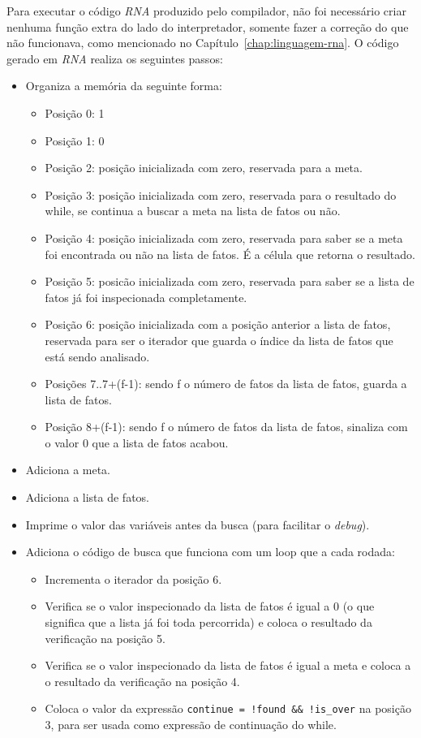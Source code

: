 
Para executar o código \emph{RNA} produzido pelo compilador, não foi necessário criar nenhuma função extra do lado do interpretador, somente fazer a correção do que não funcionava, como mencionado no Capítulo~\ref{chap:linguagem-rna}. O código gerado em \emph{RNA} realiza os seguintes passos:

\begin{itemize}
	\item Organiza a memória da seguinte forma:
	
	\begin{itemize}
		\item Posição 0: 1
		\item Posição 1: 0
		\item Posição 2: posição inicializada com zero, reservada para a meta.
		\item Posição 3: posição inicializada com zero, reservada para o resultado do while, se continua a buscar a meta na lista de fatos ou não.
		\item Posição 4: posição inicializada com zero, reservada para saber se a meta foi encontrada ou não na lista de fatos. É a célula que retorna o resultado.
		\item Posição 5: posicão inicializada com zero, reservada para saber se a lista de fatos já foi inspecionada completamente.
		\item Posição 6: posição inicializada com a posição anterior a lista de fatos, reservada para ser o iterador que guarda o índice da lista de fatos que está sendo analisado.
		\item Posições 7..7+(f-1): sendo f o número de fatos da lista de fatos, guarda a lista de fatos.
		\item Posição 8+(f-1): sendo f o número de fatos da lista de fatos, sinaliza com o valor 0 que a lista de fatos acabou.
	\end{itemize}
	
	\item Adiciona a meta.
	\item Adiciona a lista de fatos.
	\item Imprime o valor das variáveis antes da busca (para facilitar o \emph{debug}).
	\item Adiciona o código de busca que funciona com um loop que a cada rodada:
	
	\begin{itemize}
		\item Incrementa o iterador da posição 6.
		\item Verifica se o valor inspecionado da lista de fatos é igual a 0 (o que significa que a lista já foi toda percorrida) e coloca o resultado da verificação na posição 5.
		\item Verifica se o valor inspecionado da lista de fatos é igual a meta e coloca a o resultado da verificação na posição 4.
		\item Coloca o valor da expressão \verb$continue = !found && !is_over$ na posição 3, para ser usada como expressão de continuação do while.
	\end{itemize}
	

\end{itemize}
